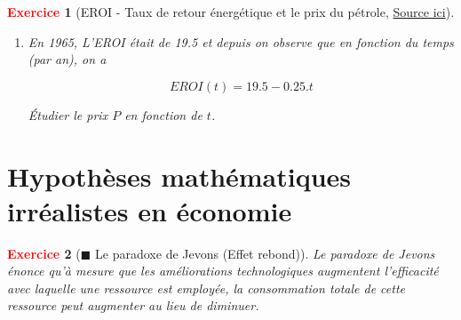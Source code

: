 \documentclass[11pt]{article}
\theoremstyle{mythmstyle}
\newtheorem{exo}{\textcolor{red}{\textbf{Exercice}}}
\begin{document}
\begin{exo}[EROI - Taux de retour énergétique et le prix du pétrole, \href{https://www.sciencedirect.com/science/article/pii/S0301421511006975}{Source ici}]
\begin{enumerate}
\begin{enumerate}
\item En 1965, L'EROI était de 19.5 et depuis on observe que en fonction du temps (par an), on a

$$EROI(t)= 19.5 - 0.25.t$$

Étudier le prix $P$ en fonction de $t$.

    \end{enumerate}
\end{enumerate}




\end{exo}

\section{Hypothèses mathématiques irréalistes en économie}


\begin{exo}[$\blacksquare$ Le paradoxe de Jevons (Effet rebond)]
Le paradoxe de Jevons énonce qu'à mesure que les améliorations technologiques augmentent l'efficacité avec laquelle une ressource est employée, la consommation totale de cette ressource peut augmenter au lieu de diminuer.
\end{exo}
\end{document}
